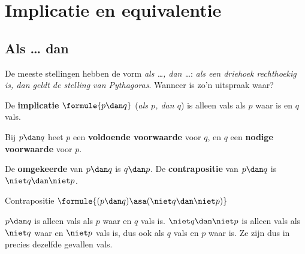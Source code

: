 \begin{oefeningen}

\end{oefeningen}

\section{Implicatie en equivalentie}

\subsection{Als \ldots{} dan}

De meeste stellingen hebben de vorm \textit{als \ldots, dan \ldots}: \textit{als een driehoek rechthoekig is, dan geldt de stelling van Pythagoras}. Wanneer is zo'n uitspraak waar?

\begin{theorie}
De \textbf{\textcolor{accent}{implicatie}} $\formule{p \dan q}$ (\textit{als $p$, dan $q$}) is alleen vals als $p$ waar is en $q$ vals.

\vspace{1mm}
Bij $p \dan q$ heet $p$ een \textbf{\textcolor{accent}{voldoende voorwaarde}} voor $q$, en $q$ een \textbf{\textcolor{accent}{nodige voorwaarde}} voor $p$.

\vspace{1mm}
De \textbf{\textcolor{accent}{omgekeerde}} van $p \dan q$ is $q \dan p$. De \textbf{\textcolor{accent}{contrapositie}} van $p \dan q$ is $\niet q \dan \niet p$.

\begin{stelling}{Contrapositie}
\qquad $\formule{(p \dan q) \asa (\niet q \dan \niet p)}$
\end{stelling}

\begin{bewijs}
$p \dan q$ is alleen vals als $p$ waar en $q$ vals is. $\niet q \dan \niet p$ is alleen vals als $\niet q$ waar en $\niet p$ vals is, dus ook als $q$ vals en $p$ waar is. Ze zijn dus in precies dezelfde gevallen vals.
\end{bewijs}
\end{theorie}

